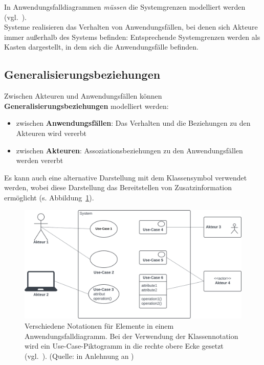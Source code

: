 \noindent
In Anwendungsfalldiagrammen \textit{müssen} die Systemgrenzen modelliert werden (vgl.~\cite[52]{Buh09}).\\
Systeme realisieren das Verhalten von Anwendungsfällen, bei denen sich Akteure immer außerhalb des Systems befinden: Entsprechende Systemgrenzen werden als Kasten dargestellt, in dem sich  die Anwendungsfälle befinden.

\subsection{Generalisierungsbeziehungen}
Zwischen Akteuren und Anwendungsfällen können \textbf{Generalisierungsbeziehungen} modelliert werden:

\begin{itemize}
    \item zwischen \textbf{Anwendungsfällen}: Das Verhalten und die Beziehungen zu den Akteuren wird vererbt
    \item zwischen \textbf{Akteuren}: Assoziationsbeziehungen zu den Anwendungsfällen werden vererbt
\end{itemize}

\noindent
Es kann auch eine alternative Darstellung mit dem Klassensymbol verwendet werden, wobei diese Darstellung das Bereitstellen von Zusatzinformation ermöglicht (s. Abbildung~\ref{fig:usecase-notation}).


\begin{figure}
    \centering
    \includegraphics[scale=0.35]{part three/Anwendungsfalldiagramm/img/usecase-notation}
    \caption{Verschiedene Notationen für Elemente in einem Anwendungsfalldiagramm. Bei der Verwendung der Klassennotation wird ein Use-Case-Piktogramm in die rechte obere Ecke gesetzt (vgl.~\cite[63 f.]{Bal05}). (Quelle: in Anlehnung an \cite[64, Abb. 2.8-2]{Bal05})}
    \label{fig:usecase-notation}
\end{figure}


